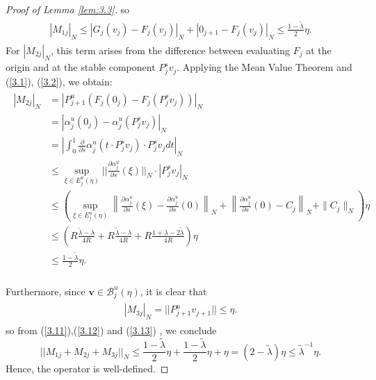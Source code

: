 \documentclass[10pt,a4paper]{amsart}
\begin{document}
\begin{proof}[Proof of Lemma \ref{lem:3.3}]
		so
		\begin{align} \label{3.11}
			\begin{split}
				|M_{1j}|_{N}\leqslant|G_{j}(v_{j})-F_{j}(v_{j})|_{N}+|0_{j+1}-F_{j}(v_{j})|_{N}\leqslant\frac{1-\widetilde\lambda}{2}\eta.
			\end{split}
		\end{align}
		For $ |M_{2j}|_{N} $, this term arises from the difference between evaluating $ F_{j} $ at the origin and at the stable component $ P_{j}^{s}v_{j} $. Applying the Mean Value Theorem and (\ref{3.1}), (\ref{3.2}), we obtain:
		\begin{align} \label{3.12}
			\begin{split}
				|M_{2j}|_{N}
				&=|P_{j+1}^{u}(F_{j}(0_{j})-F_{j}(P_{j}^{s}v_{j}))|_{N}\\
				&=|\alpha_{j}^{u}(0_{j})-\alpha_{j}^{u}(P_{j}^{s}v_{j})|_{N}\\
				&=|\int_{0}^{1}\frac{\partial}{\partial s}\alpha_{j}^{u}(t\cdot P_{j}^{s}v_{j}) \cdot P_{j}^{s}v_{j}dt|_{N}\\
				&\leqslant \underset{\xi\in E_{j}^{u}(\eta) }{\sup}||\frac{\partial\alpha_{j}^{u}}{\partial s}(\xi)||_{N}\cdot |P_{j}^{s}v_{j}|_{N} \\
				&\leqslant   \left(\sup\limits_{\xi\in E^u_{j}(\eta)}
				\left\|\frac{\partial \alpha_j^u}{\partial s}(\xi) -\frac{\partial \alpha_j^u}{\partial s}(0) \right\|_{N}+ \left\|\frac{\partial \alpha_j^u}{\partial s}(0) -C_{j} \right\|_{N} +\|C_{j} \|_{N}\right) \eta\\
				&\leqslant (R\frac{\widetilde\lambda-\lambda}{4R}+R\frac{\widetilde\lambda-\lambda}{4R}  + R\frac{1+\lambda-2\widetilde\lambda}{4R}) \eta  \\
				&\leqslant \frac{1-\widetilde\lambda}{2} \eta.\\
			\end{split}
		\end{align}
		
		Furthermore, since $ \boldsymbol{v}\in\mathcal{B}_{j}^{u}(\eta) $, it is clear that
		\begin{align}\label{3.13}
			\begin{split}
				|M_{3j}|_{N}=||P_{j+1}^{u}v_{j+1}||\leqslant\eta.
			\end{split}
		\end{align}
		so from (\ref{3.11}),(\ref{3.12}) and (\ref{3.13}) , we conclude
		$$
		||M_{1j}+M_{2j}+M_{3j}||_{N}\leqslant \frac{1-\widetilde\lambda}{2}\eta+\frac{1-\widetilde\lambda}{2}\eta+\eta=(2-\widetilde\lambda)\eta\leqslant\widetilde\lambda^{-1}\eta.
		$$
		Hence, the operator is well-defined.
	\end{proof}
\end{document}

